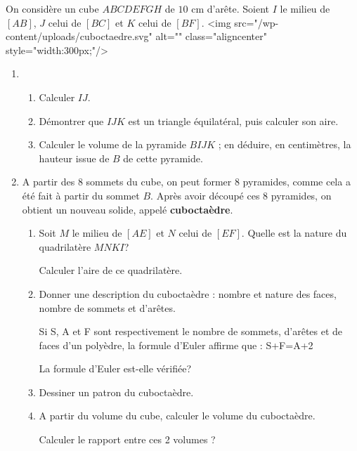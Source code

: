 
%
On considère un cube $ABCDEFGH$ de $10$ cm d'arête. Soient $I$ le milieu de $[AB]$, $J$ celui de $[BC]$ et $K$ celui de $[BF]$.
<img src="/wp-content/uploads/cuboctaedre.svg" alt="" class="aligncenter" style="width:300px;"/>
\begin{enumerate}
     \item
     \begin{enumerate}
          \item
          Calculer $IJ$.
          \item
          Démontrer que $IJK$ est un triangle équilatéral, puis calculer son aire.
          \item
          Calculer le volume de la pyramide $BIJK$ ; en déduire, en centimètres, la hauteur issue de $B$ de cette pyramide.
     \end{enumerate}
     \item
     A partir des 8 sommets du cube, on peut former 8 pyramides, comme cela a été fait à partir du sommet $B$. Après avoir découpé ces 8 pyramides, on obtient un nouveau solide, appelé  \textbf{cuboctaèdre}.
     \begin{enumerate}
          \item
          Soit $M$ le milieu de $[AE]$ et $N$ celui de $[EF]$. Quelle est la nature du quadrilatère $MNKI$?
          \par
          Calculer l'aire de ce quadrilatère.
          \item
          Donner une description du cuboctaèdre : nombre et nature des faces, nombre de sommets et d'arêtes.
          \par
          Si S, A et F sont respectivement le nombre de sommets, d'arêtes et de faces d'un polyèdre, la formule d'Euler affirme que : S+F=A+2
          \par
          La formule d'Euler est-elle vérifiée?
          \item
          Dessiner un patron du cuboctaèdre.
          \item
          A partir du volume du cube, calculer le volume du cuboctaèdre.
          \par
          Calculer le rapport entre ces 2 volumes ?
     \end{enumerate}
\end{enumerate}
